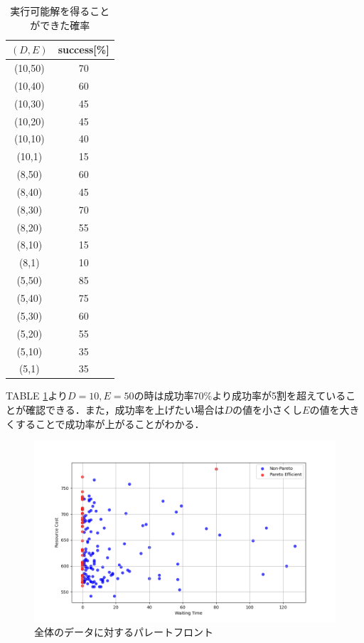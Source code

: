 \documentclass[conference]{IEEEtran}
\begin{document}
\begin{table}[h]
    \centering
    \caption{実行可能解を得ることができた確率}
    \label{feasible}
    \begin{tabular}{|c|c|}
        \hline
        $(D,E)$ & success[\%]\\ \hline
        (10,50) & 70\\ \hline
        (10,40) & 60\\ \hline
        (10,30) & 45\\ \hline
        (10,20) & 45\\ \hline
        (10,10) & 40\\ \hline
        (10,1) & 15\\ \hline
        (8,50) & 60\\ \hline
        (8,40) & 45\\ \hline
        (8,30) & 70\\ \hline
        (8,20) & 55\\ \hline
        (8,10) & 15\\ \hline
        (8,1) & 10\\ \hline
        (5,50) & 85\\ \hline
        (5,40) & 75\\ \hline
        (5,30) & 60\\ \hline
        (5,20) & 55\\ \hline
        (5,10) & 35\\ \hline
        (5,1) & 35\\ \hline
    \end{tabular}
\end{table}

TABLE \ref{feasible}より$D=10,E=50$の時は成功率70\%より成功率が5割を超えていることが確認できる．また，成功率を上げたい場合は$D$の値を小さくし$E$の値を大きくすることで成功率が上がることがわかる．

\begin{figure}[htbp]
\centerline{\includegraphics[scale=0.3]{./fig/pareto_solution.pdf}}
\caption{全体のデータに対するパレートフロント}
\label{fig6}
\end{figure}
\end{document}
